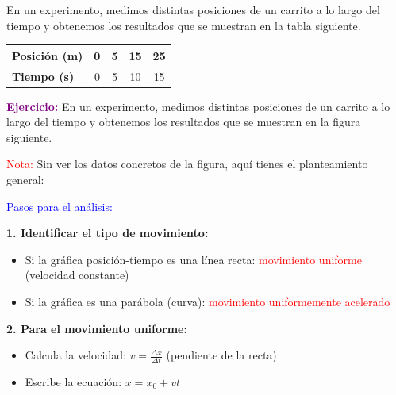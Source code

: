 \begin{exercise}
    En un experimento, medimos distintas posiciones de un carrito a lo largo del tiempo y obtenemos los resultados que se muestran en la tabla siguiente.

    \begin{table}[H]
        \centering
        \renewcommand{\arraystretch}{1.5}
        \begin{tabular}{Occcc}
            \bottomrule
            \textcolor{ocre}{\textbf{Posición (\unit{\metre})}} & 0 & 5 & 15 & 25 \\
            \hline
            \textcolor{ocre}{\textbf{Tiempo (\unit{\s})}}         & 0 & 5 & 10 & 15 \\
            \toprule
        \end{tabular}
        \label{tab:ejercicio1}
    \end{table}
%
    \begin{solu}
        \textbf{\textcolor{purple}{Ejercicio:}} En un experimento, medimos distintas posiciones de un carrito a lo largo del tiempo y obtenemos los resultados que se muestran en la figura siguiente.

        \vspace{0.3cm}

        \textcolor{red}{Nota:} Sin ver los datos concretos de la figura, aquí tienes el planteamiento general:

        \textcolor{blue}{Pasos para el análisis:}

        \textbf{1. Identificar el tipo de movimiento:}
        \begin{itemize}
            \item Si la gráfica posición-tiempo es una línea recta: \textcolor{red}{movimiento uniforme} (velocidad constante)
            \item Si la gráfica es una parábola (curva): \textcolor{red}{movimiento uniformemente acelerado}
        \end{itemize}

        \textbf{2. Para el movimiento uniforme:}
        \begin{itemize}
            \item Calcula la velocidad: $v = \frac{\Delta x}{\Delta t}$ (pendiente de la recta)
            \item Escribe la ecuación: $x = x_0 + vt$
        \end{itemize}


\end{solu}
\end{exercise}

